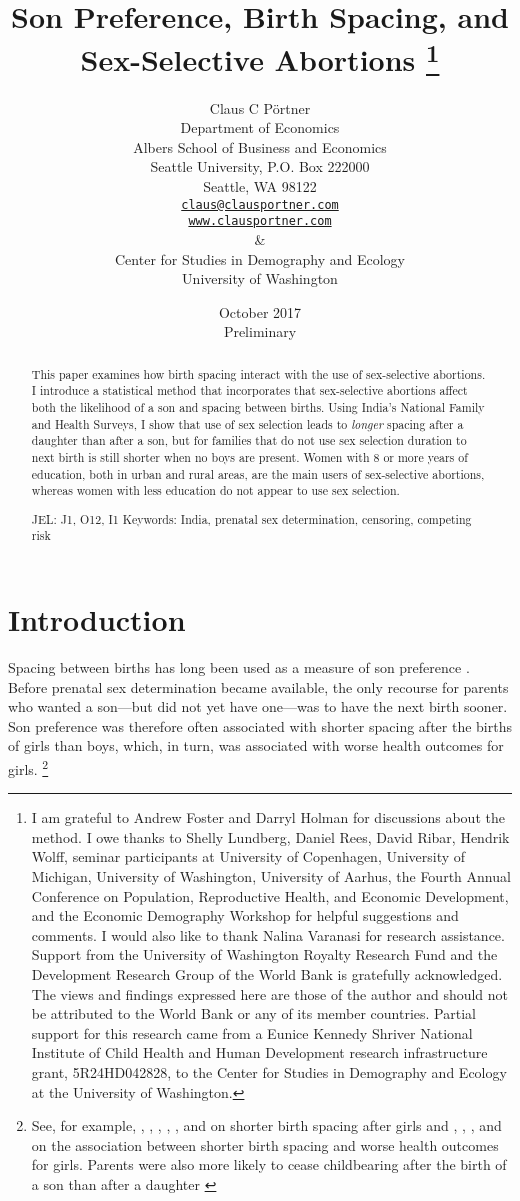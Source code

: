 \documentclass[12pt,letterpaper]{article}
\title{Son Preference, Birth Spacing, and Sex-Selective Abortions%
\protect\thanks{%
I am grateful to Andrew Foster and Darryl Holman for discussions about the method.
I owe thanks to Shelly Lundberg, Daniel Rees, David Ribar, 
Hendrik Wolff, seminar participants at University of Copenhagen, University of Michigan, 
University of Washington, University of Aarhus, the Fourth 
Annual Conference on Population, Reproductive Health, 
and Economic Development, and the Economic Demography Workshop for helpful suggestions and comments.
I would also like to thank Nalina Varanasi for research assistance.
Support from the University of Washington Royalty Research Fund and the 
Development Research Group of the World Bank is gratefully acknowledged.
The views and findings expressed here are those of the author and
should not be attributed to the World Bank or any of its member countries.
Partial support for this research came from a Eunice Kennedy Shriver National
Institute of Child Health and Human Development research infrastructure grant,
5R24HD042828, to the Center for Studies in Demography and Ecology at the
University of Washington.
}
}
\author{}
\author{Claus C P\"ortner\\
    Department of Economics\\
    Albers School of Business and Economics\\
    Seattle University, P.O. Box 222000\\
    Seattle, WA 98122\\
    \href{mailto:claus@clausportner.com}{\texttt{claus@clausportner.com}}\\
    \href{http://www.clausportner.com}{\texttt{www.clausportner.com}}\\
    \& \\
    Center for Studies in Demography and Ecology \\
    University of Washington\\ \vspace{2cm}
    }
\date{October 2017\\
\bigskip
Preliminary}
\begin{document}
\graphicspath{{../figures/}}

\setcounter{page}{-1}
\maketitle
\thispagestyle{empty}



\newpage
\thispagestyle{empty}
\doublespacing

\begin{abstract}

\noindent This paper examines how birth spacing interact with the use of 
sex-selective abortions. 
I introduce a statistical method that incorporates that sex-selective abortions 
affect both the likelihood of a son and spacing between births.
Using India's National Family and Health Surveys,
I show that use of sex selection leads to \emph{longer} spacing after a daughter 
than after a son, but for families that do not use sex selection
duration to next birth is still shorter when no boys are present.
Women with 8 or more years of education, both in urban and rural areas, are 
the main users of sex-selective abortions, whereas women with less education 
do not appear to use sex selection.


\noindent JEL: J1, O12, I1
\noindent Keywords: India, prenatal sex determination, censoring, competing risk
\end{abstract}

\newpage



\section{Introduction\label{sec:intro}}

Spacing between births has long been used as a measure of son preference 
\citep{Leung1988}.
Before prenatal sex determination became available, the only recourse for 
parents who wanted a son---but did not yet have one---was to have the next 
birth sooner.
Son preference was therefore often associated with shorter spacing after the 
births of girls than boys, which, in turn, was associated with worse 
health outcomes for girls.%
\footnote{
See, for example, 
\citet{Das1987}, \citet{Rahman1993}, \citet{Pong1994}, \citet{Haughton1996},
\citet{Arnold1997}, and \citet{Soest2012} on shorter birth spacing after
girls
and 
\citet{arnold98}, \citet{Whitworth2002}, \citet{Rutstein2005},
and \citet{Conde-Agudelo2006} on the association between shorter birth
spacing and worse health outcomes for girls.
Parents were also more likely to cease childbearing after the birth of 
a son than after a daughter 
\citep{ben-porath76b,Das1987,Arnold1997,clark00,filmer09,Altindag2016}
}
\end{document}
